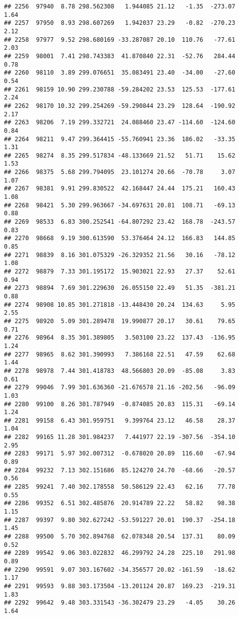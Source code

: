 \documentclass[]{article}
\begin{document}
\begin{verbatim}
## 2256  97940  8.78 298.562308   1.944085 21.12   -1.35  -273.07  1.64
## 2257  97950  8.93 298.607269   1.942037 23.29   -0.82  -270.23  2.12
## 2258  97977  9.52 298.680169 -33.287087 20.10  110.76   -77.61  2.03
## 2259  98001  7.41 298.743383  41.870840 22.31  -52.76   284.44  0.78
## 2260  98110  3.89 299.076651  35.083491 23.40  -34.00   -27.60  0.54
## 2261  98159 10.90 299.230788 -59.284202 23.53  125.53  -177.61  2.24
## 2262  98170 10.32 299.254269 -59.290844 23.29  128.64  -190.92  2.17
## 2263  98206  7.19 299.332721  24.088460 23.47 -114.60  -124.60  0.84
## 2264  98211  9.47 299.364415 -55.760941 23.36  186.02   -33.35  1.31
## 2265  98274  8.35 299.517834 -48.133669 21.52   51.71    15.62  1.53
## 2266  98375  5.68 299.794095  23.101274 20.66  -70.78     3.07  1.07
## 2267  98381  9.91 299.830522  42.168447 24.44  175.21   160.43  1.08
## 2268  98421  5.30 299.963667 -34.697631 20.81  108.71   -69.13  0.88
## 2269  98533  6.83 300.252541 -64.807292 23.42  168.78  -243.57  0.83
## 2270  98668  9.19 300.613590  53.376464 24.12  166.83   144.85  0.85
## 2271  98839  8.16 301.075329 -26.329352 21.56   30.16   -78.12  1.08
## 2272  98879  7.33 301.195172  15.903021 22.93   27.37    52.61  0.94
## 2273  98894  7.69 301.229630  26.055150 22.49   51.35  -381.21  0.88
## 2274  98908 10.85 301.271818 -13.448430 20.24  134.63     5.95  2.55
## 2275  98920  5.09 301.289478  19.990877 20.17   30.61    79.65  0.71
## 2276  98964  8.35 301.389805   3.503100 23.22  137.43  -136.95  1.24
## 2277  98965  8.62 301.390993   7.386168 22.51   47.59    62.68  1.44
## 2278  98978  7.44 301.418783  48.566803 20.09  -85.08     3.83  0.61
## 2279  99046  7.99 301.636360 -21.676578 21.16 -202.56   -96.09  1.03
## 2280  99100  8.26 301.787949  -0.874085 20.83  115.31   -69.14  1.24
## 2281  99158  6.43 301.959751   9.399764 23.12   46.58    28.37  1.04
## 2282  99165 11.28 301.984237   7.441977 22.19 -307.56  -354.10  2.95
## 2283  99171  5.97 302.007312  -0.678020 20.89  116.60   -67.94  0.89
## 2284  99232  7.13 302.151686  85.124270 24.70  -68.66   -20.57  0.56
## 2285  99241  7.40 302.178558  50.586129 22.43   62.16    77.78  0.55
## 2286  99352  6.51 302.485876  20.914789 22.22   58.82    98.38  1.15
## 2287  99397  9.80 302.627242 -53.591227 20.01  190.37  -254.18  1.45
## 2288  99500  5.70 302.894768  62.078348 20.54  137.31    80.09  0.52
## 2289  99542  9.06 303.022832  46.299792 24.28  225.10   291.98  0.89
## 2290  99591  9.07 303.167602 -34.356577 20.02 -161.59   -18.62  1.17
## 2291  99593  9.88 303.173504 -13.201124 20.87  169.23  -219.31  1.83
## 2292  99642  9.48 303.331543 -36.302479 23.29   -4.05    30.26  1.64

\end{verbatim}
\end{document}
